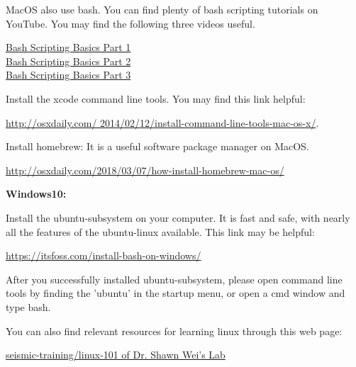 \documentclass[12pt]{article}   	%
\begin{document}
MacOS also use bash. You can find plenty of bash scripting tutorials on YouTube. You may find the following three videos useful.
\begin{center}
\href{https://www.youtube.com/watch?v=NSu4IWlOU7k}{Bash Scripting Basics Part 1}\\
\href{https://www.youtube.com/watch?v=NSu4IWlOU7k}{Bash Scripting Basics Part 2}\\
\href{https://www.youtube.com/watch?v=NSu4IWlOU7k}{Bash Scripting Basics Part 3}\\
\end{center}
Install the xcode command line tools.  You may find this link helpful: 
\begin{center}
\href{http://osxdaily.com/2014/02/12/install-command-line-tools-mac-os-x/}{http://osxdaily.com/ 2014/02/12/install-command-line-tools-mac-os-x/}. 
\end{center}
Install homebrew: It is a useful software package manager on MacOS.  
\begin{center}
\href{http://osxdaily.com/2018/03/07/how-install-homebrew-mac-os/}{http://osxdaily.com/2018/03/07/how-install-homebrew-mac-os/}\\
\end{center}

\textbf{Windows10:}

Install the ubuntu-subsystem on your computer. It is fast and safe, with nearly all the features of the ubuntu-linux available. This link may be helpful: 
\begin{center}
\href{https://itsfoss.com/install-bash-on-windows/}{https://itsfoss.com/install-bash-on-windows/} 
\end{center}
After you successfully installed ubuntu-subsystem, please open command line tools by finding the 'ubuntu' in the startup menu, or open a cmd window and type bash.

You can also find relevant resources for learning linux through this web page: 
\begin{center}
\href{https://sites.google.com/msu.edu/wei-seismic-training/linux-101?authuser=0}{seismic-training/linux-101 of Dr. Shawn Wei's Lab}
\end{center}
\end{document}
